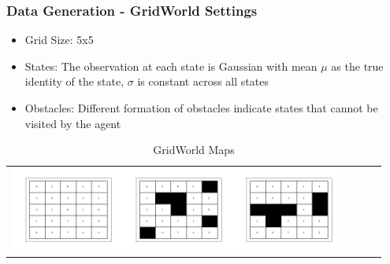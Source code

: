 \documentclass{beamer}
\begin{document}
\begin{frame}
    \frametitle{Data Generation - GridWorld Settings}
        \begin{itemize}
            \item Grid Size: 5x5
            \item States: The observation at each state is Gaussian with mean $\mu$ as the true identity of the state, $\sigma$ is constant across all states
            \item Obstacles: Different formation of obstacles indicate states that cannot be visited by the agent
        \end{itemize}

        \newcommand{\addmapa}{\includegraphics[width=10em]{data/Model1/5x5;4;free.png}}
        \newcommand{\addmapb}{\includegraphics[width=10em]{data/Model2/5x5;4;6box.png}}
        \newcommand{\addmapc}{\includegraphics[width=10em]{data/Model3/5x5;4;6sep.png}}
        \begin{table}[H]
        \sffamily
        \centering
        \begin{tabular}{l*3{C}@{}}
        \addmapa \addmapb \addmapc \\
        \end{tabular}
        \caption{GridWorld Maps}
        \end{table}
\end{frame}
\end{document}
